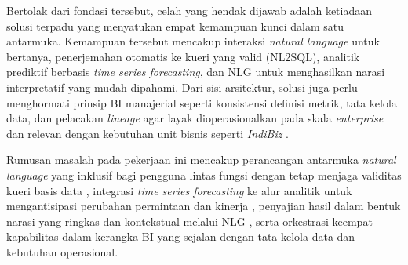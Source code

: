 \documentclass[12pt,a4paper,oneside]{book}
\begin{document}
Bertolak dari fondasi tersebut, celah yang hendak dijawab adalah ketiadaan solusi terpadu yang menyatukan empat kemampuan kunci dalam satu antarmuka. Kemampuan tersebut mencakup interaksi \textit{natural language} untuk bertanya, penerjemahan otomatis ke kueri yang valid (NL2SQL), analitik prediktif berbasis \textit{time series forecasting}, dan NLG untuk menghasilkan narasi interpretatif yang mudah dipahami. Dari sisi arsitektur, solusi juga perlu menghormati prinsip BI manajerial seperti konsistensi definisi metrik, tata kelola data, dan pelacakan \textit{lineage} agar layak dioperasionalkan pada skala \textit{enterprise} \parencite{Sharda2020} dan relevan dengan kebutuhan unit bisnis seperti \textit{IndiBiz} \parencite{IndiBiz2024Site}.

Rumusan masalah pada pekerjaan ini mencakup perancangan antarmuka \textit{natural language} yang inklusif bagi pengguna lintas fungsi dengan tetap menjaga validitas kueri basis data \parencite{Gao2023,Li2024}, integrasi \textit{time series forecasting} ke alur analitik untuk mengantisipasi perubahan permintaan dan kinerja \parencite{Lim2021,Benidis2020}, penyajian hasil dalam bentuk narasi yang ringkas dan kontekstual melalui NLG \parencite{Gatt2018,Dale2020}, serta orkestrasi keempat kapabilitas dalam kerangka BI yang sejalan dengan tata kelola data dan kebutuhan operasional.

\printbibliography[heading=bibintoc, title={DAFTAR PUSTAKA}]
\end{document}

